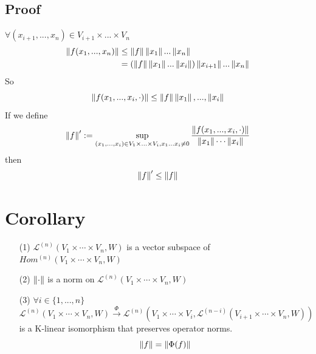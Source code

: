 \documentclass{book}
\begin{document}
\subsection*{Proof}
$\forall(x_{i+1},...,x_n)\in V_{i+1}\times...\times V_n$$$\begin{aligned}
    \left\lVert f(x_1,...,x_n) \right\rVert &\leq\left\lVert f \right\rVert\left\lVert x_1 \right\rVert...\left\lVert x_n \right\rVert\\
    &=(\left\lVert f \right\rVert\left\lVert x_1 \right\rVert...\left\lVert x_i \right\rVert)\left\lVert x_{i+1} \right\rVert...\left\lVert x_n \right\rVert
\end{aligned}$$
So $$\left\lVert f(x_1,...,x_i,\cdot) \right\rVert\leq\left\lVert f \right\rVert\left\lVert x_1 \right\rVert,...,\left\lVert x_i \right\rVert$$
If we define$$\left\lVert f \right\rVert':=\sup\limits_{(x_1,...,x_i)\in V_1\times...\times V_i,x_1...x_i\neq0}\frac{\left\lVert f(x_1,...,x_i,\cdot) \right\rVert}{\left\lVert x_1 \right\rVert\cdots\left\lVert x_i \right\rVert}$$
then $$\left\lVert f \right\rVert'\leq\left\lVert f \right\rVert$$
\section{Corollary}
\begin{itemize}
    \item [(1)]$\mathscr{L}^{(n)}(V_1\times\cdots\times V_n,W)$ is a vector subspace of $Hom^{(n)}(V_1\times\cdots\times V_n,W)$
    \item [(2)]$\left\lVert \cdot \right\rVert$ is a norm on $\mathscr{L}^{(n)}(V_1\times\cdots\times V_n,W)$
    \item [(3)]$\forall i\in \{1,...,n\}$$$\mathscr{L}^{(n)}(V_1\times\cdots\times V_n,W)\stackrel{\Phi}{\rightarrow}\mathscr{L}^{(n)}(V_1\times\cdots\times V_i,\mathscr{L}^{(n-i)}(V_{i+1}\times\cdots\times V_n,W))$$ is a K-linear isomorphism that preserves operator norms.$$\left\lVert f \right\rVert=\left\lVert \Phi(f) \right\rVert$$
\end{itemize}
\end{document}
